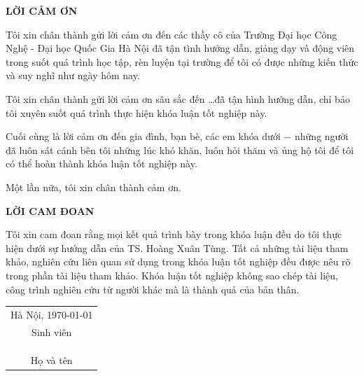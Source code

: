 \documentclass{thesis}
\begin{document}
\pagebreak


\begin{titlepage}
    \begin{center}
        \bf{LỜI CẢM ƠN}
    \end{center}

    \par Tôi xin chân thành gửi lời cảm ơn đến các thầy cô của Trường Đại học Công Nghệ - Đại học Quốc Gia Hà Nội đã tận tình hướng dẫn, giảng dạy và động viên trong suốt quá trình học tập, rèn luyện tại trường để tôi có được những kiến thức và suy nghĩ như ngày hôm nay.
    
    \par Tôi xin chân thành gửi lời cảm ơn sâu sắc đến \ldots đã tận hình hướng dẫn, chỉ bảo tôi xuyên suốt quá trình thực hiện khóa luận tốt nghiệp này.
    
    \par Cuối cùng là lời cảm ơn đến gia đình, bạn bè, các em khóa dưới $-$ những người đã luôn sát cánh bên tôi những lúc khó khăn, luôn hỏi thăm và ủng hộ tôi để tôi có thể hoàn thành khóa luận tốt nghiệp này.
    
    \par Một lần nữa, tôi xin chân thành cảm ơn.
\end{titlepage}
\pagebreak
    
\begin{titlepage}
    \begin{center}
        \bf{LỜI CAM ĐOAN}
    \end{center}
    
    \par Tôi xin cam đoan rằng mọi kết quả trình bày trong khóa luận đều do tôi thực hiện dưới sự hướng dẫn của TS. Hoàng Xuân Tùng. Tất cả những tài liệu tham khảo, nghiên cứu liên quan sử dụng trong khóa luận tốt nghiệp đều được nêu rõ trong phần tài liệu tham khảo. Khóa luận tốt nghiệp không sao chép tài liệu, công trình nghiên cứu từ người khác mà là thành quả của bản thân. 
    
    \begin{flushright}
        \begin{tabular}{@{}c@{}}
        Hà Nội, \MakeLowercase{\today}\\
        Sinh viên \\
        \\
        \\
        \\
        Họ và tên
        \end{tabular}
    \end{flushright}
\end{titlepage}
\end{document}
